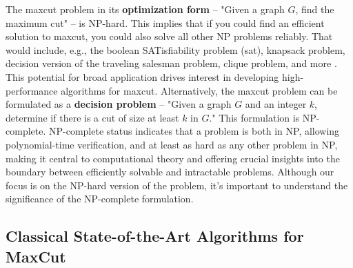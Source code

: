 The \acrshort{maxcut} problem in its \textbf{optimization form} – "Given a graph $G$, find the maximum cut" – is NP-hard. This implies that if you could find an efficient solution to \acrshort{maxcut}, you could also solve all other NP problems reliably. That would include, e.g., the boolean SATisfiability problem (\acrshort{sat}), knapsack problem, decision version of the traveling salesman problem, clique problem, and more \cite{NP-problems}. This potential for broad application drives interest in developing high-performance algorithms for \acrshort{maxcut}. Alternatively, the \acrshort{maxcut} problem can be formulated as a \textbf{decision problem} – "Given a graph $G$ and an integer $k$, determine if there is a cut of size at least $k$ in $G$." This formulation is NP-complete. NP-complete status indicates that a problem is both in NP, allowing polynomial-time verification, and at least as hard as any other problem in NP, making it central to computational theory and offering crucial insights into the boundary between efficiently solvable and intractable problems. Although our focus is on the NP-hard version of the problem, it's important to understand the significance of the NP-complete formulation.





\subsection{Classical State-of-the-Art Algorithms for MaxCut}
\label{section:Classical-State-of-the-Art}

